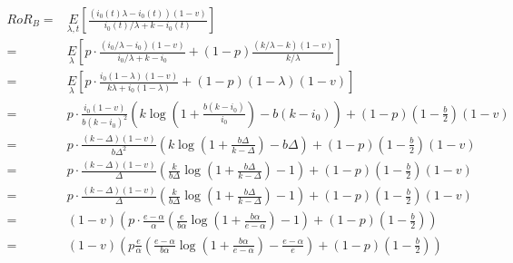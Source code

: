 \begin{align*}
RoR_B =& \underset{\lambda, t}E\left[\frac{(i_0(t)\lambda - i_0(t))(1-v)}{i_0(t)/\lambda + k - i_0(t)}\right]\\
      =& \underset{\lambda}E\left[p\cdot\frac{(i_0/\lambda - i_0)(1-v)}{i_0/\lambda + k - i_0} + (1-p)\frac{(k/\lambda - k)(1-v)}{k/\lambda}\right]\\
      =& \underset{\lambda}E\left[p\cdot\frac{i_0(1-\lambda)(1-v)}{k\lambda + i_0(1-\lambda)} + (1-p)(1-\lambda)(1-v)\right]\\
      =& p\cdot\frac{i_0(1-v)}{b(k-i_0)^2}\left(k\log\left(1+\frac{b(k-i_0)}{i_0}\right) - b(k-i_0)\right) + (1-p)(1-\frac{b}{2})(1-v)\\
      =& p\cdot\frac{(k-\Delta)(1-v)}{b\Delta^2}\left(k\log\left(1+\frac{b\Delta}{k-\Delta}\right) - b\Delta\right) + (1-p)(1-\frac{b}{2})(1-v)\\
      =& p\cdot\frac{(k-\Delta)(1-v)}{\Delta}\left(\frac{k}{b\Delta}\log\left(1+\frac{b\Delta}{k-\Delta}\right) - 1\right) + (1-p)(1-\frac{b}{2})(1-v)\\
      =& p\cdot\frac{(k-\Delta)(1-v)}{\Delta}\left(\frac{k}{b\Delta}\log\left(1+\frac{b\Delta}{k-\Delta}\right) - 1\right) + (1-p)(1-\frac{b}{2})(1-v)\\
      =& (1-v)\left(p\cdot\frac{e-\alpha}{\alpha}\left(\frac{e}{b\alpha}\log\left(1+\frac{b\alpha}{e-\alpha}\right) - 1\right) + (1-p)(1-\frac{b}{2})\right)\\
      =& (1-v)\left(p\frac{e}{\alpha}\left(\frac{e-\alpha}{b\alpha}\log\left(1+\frac{b\alpha}{e-\alpha}\right) - \frac{e-\alpha}{e}\right) + (1-p)(1-\frac{b}{2})\right)
\end{align*}

